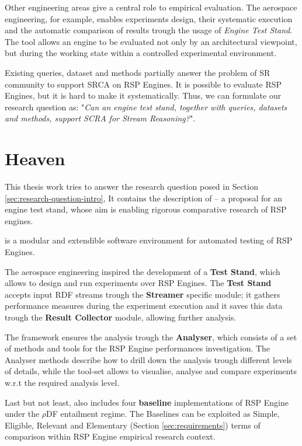 Other engineering areas give a central role to empirical evaluation. The aerospace engineering, for example, enables experiments design, their systematic execution and the automatic comparison of results trough the usage of \textit{Engine Test Stand}. The tool allows an engine to be evaluated not only by an architectural viewpoint, but during the working state within a controlled experimental environment.

Existing queries, dataset and methods partially answer the problem of SR community to support SRCA on RSP Engines. It is possible to evaluate RSP Engines, but it is hard to make it systematically. Thus, we can formulate our research question as: "\textit{Can an engine test stand, together with queries, datasets and methods, support SCRA for Stream Reasoning?}".

\section{Heaven}\label{sec:heaven-intro}

This thesis work tries to answer the research question posed in Section \ref{sec:research-question-intro}, It contains the description of \name -- a proposal for an engine test stand,  whose aim is enabling rigorous comparative research of RSP engines. 

\name is a modular and extendible software environment for automated testing of RSP Engines. 

The aerospace engineering inspired the development of a \textbf{Test Stand}, which allows to design and run experiments over RSP Engines. The \textbf{Test Stand} accepts input RDF streams trough the \textbf{Streamer} specific module; it gathers performance measures during the experiment execution and it saves this data trough the \textbf{Result Collector} module, allowing further analysis.

The framework ensures the analysis trough the \textbf{Analyser}, which consists of a set of methods and tools for the RSP Engine performances investigation. The Analyser methods describe how to drill down the analysis trough different levels of details, while the tool-set allows to visualise, analyse and compare experiments w.r.t the required analysis level. 

Last but not least, \name also includes four \textbf{baseline} implementations of RSP Engine under the $\rho$DF \cite{DBLP:conf/esws/MunozPG07} entailment regime. The Baselines can be exploited  as Simple, Eligible, Relevant and Elementary (Section \ref{sec:requirements}) terms of comparison within RSP Engine empirical research context.  

